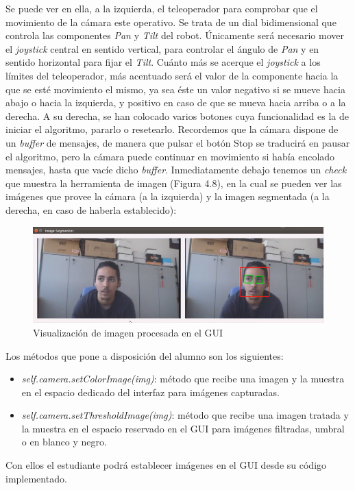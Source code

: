 Se puede ver en ella, a la izquierda, el teleoperador para comprobar que el movimiento de la cámara este operativo. Se trata de un dial bidimensional que controla las componentes \textit{Pan} y \textit{Tilt} del robot. Únicamente será necesario mover el \textit{joystick} central en sentido vertical, para controlar el ángulo de \textit{Pan} y en sentido horizontal para fijar el \textit{Tilt}. Cuánto más se acerque el \textit{joystick} a los límites del teleoperador, más acentuado será el valor de la componente hacia la que se esté movimiento el mismo, ya sea éste un valor negativo si se mueve hacia abajo o hacia la izquierda, y positivo en caso de que se mueva hacia arriba o a la derecha. A su derecha, se han colocado varios botones cuya funcionalidad es la de iniciar el algoritmo, pararlo o resetearlo. Recordemos que la cámara dispone de un \textit{buffer} de mensajes, de manera que pulsar el botón Stop se traducirá en pausar el algoritmo, pero la cámara puede continuar en movimiento si había encolado mensajes, hasta que vacíe dicho \textit{buffer}. Inmediatamente debajo tenemos un \textit{check} que muestra la herramienta de imagen (Figura 4.8), en la cual se pueden ver las imágenes que provee la cámara (a la izquierda) y la imagen segmentada (a la derecha, en caso de haberla establecido):

\begin{figure}[H]
  \begin{center}
    \includegraphics[width=0.99\linewidth]{figures/imagetool.png}
		\caption{Visualización de imagen procesada en el GUI}
		\label{fig.imagetool}
		\end{center}
\end{figure}

Los métodos que pone a disposición del alumno son los siguientes:
\begin{itemize}
\item \textit{self.camera.setColorImage(img)}: método que recibe una imagen y la muestra en el espacio dedicado del interfaz para imágenes capturadas.
	\item \textit{self.camera.setThresholdImage(img)}: método que recibe una imagen tratada y la muestra en el espacio reservado en el GUI para imágenes filtradas, umbral o en blanco y negro.
\end{itemize}
Con ellos el estudiante podrá establecer imágenes en el GUI desde su código implementado.

